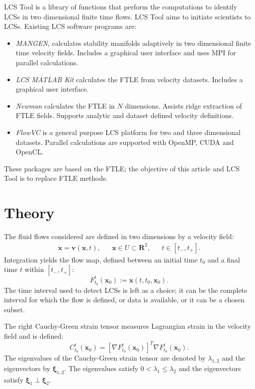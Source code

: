 \documentclass{article}
\newcommand{\reals}{\mathbf R}
\begin{document}
LCS Tool is a library of functions that perform the computations to identify LCSs in two dimensional finite time flows. LCS Tool aims to initiate scientists to LCSs. Existing LCS software programs are:
\begin{itemize}
\item \emph{MANGEN}\parencite{lekien03:_time}, calculates stability manifolds adaptively in two dimensional finite time velocity fields. Includes a graphical user interface and uses MPI for parallel calculations.
\item \emph{LCS MATLAB Kit}\parencite{dabiri09:_lmk} calculates the FTLE from velocity datasets. Includes a graphical user interface.
\item \emph{Newman}\parencite{toit10:_trans} calculates the FTLE in $N$ dimensions. Assists ridge extraction of FTLE fields. Supports analytic and dataset defined velocity definitions.
\item \emph{FlowVC}\parencite{shadden10:_flowvc} is a general purpose LCS platform for two and three dimensional datasets. Parallel calculations are supported with Open\-MP, CUDA and OpenCL.
\end{itemize}
These packages are based on the FTLE; the objective of this article and LCS Tool is to replace FTLE methods.

\section{Theory}

The fluid flows considered are defined in two dimensions by a velocity field:
\begin{align*}
\dot{\boldsymbol x} = \boldsymbol v(\boldsymbol x,t), && \boldsymbol x \in U \subset \reals^2, && t \in [t_-,t_+].
\end{align*}
Integration yields the flow map, defined between an initial time $t_0$ and a final time $t$ within $[t_-,t_+]$:
\[
F_{t_0}^t(\boldsymbol x_0) := \boldsymbol x(t,t_0,\boldsymbol x_0).
\]
The time interval used to detect LCSs is left as a choice; it can be the complete interval for which the flow is defined, or data is available, or it can be a chosen subset.

The right Cauchy-Green strain tensor measures Lagrangian strain in the velocity field and is defined:
\[
C_{t_0}^t(\boldsymbol x_0) = \left[\nabla F_{t_0}^t(\boldsymbol x_0)\right]^T \nabla F_{t_0}^t(\boldsymbol x_0).
\]
The eigenvalues of the Cauchy-Green strain tensor are denoted by $\lambda_{1,2}$ and the eigenvectors by $\boldsymbol \xi_{1,2}$. The eigenvalues satisfy $0 < \lambda_1 \leq \lambda_2$ and the eigenvectors satisfy $\boldsymbol \xi_1 \perp \boldsymbol \xi_2$.
\end{document}
